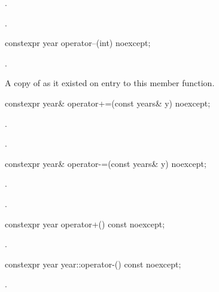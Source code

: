 \begin{itemdescr}
\pnum
\effects {}.

\pnum
\returns {}.
\end{itemdescr}

%
\begin{itemdecl}
constexpr year operator--(int) noexcept;
\end{itemdecl}

\begin{itemdescr}
\pnum
\effects {}.

\pnum
\returns A copy of  as it existed on entry to this member function.
\end{itemdescr}

%
\begin{itemdecl}
constexpr year& operator+=(const years& y) noexcept;
\end{itemdecl}

\begin{itemdescr}
\pnum
\effects {}.

\pnum
\returns {}.
\end{itemdescr}

%
\begin{itemdecl}
constexpr year& operator-=(const years& y) noexcept;
\end{itemdecl}

\begin{itemdescr}
\pnum
\effects {}.

\pnum
\returns {}.
\end{itemdescr}

%
\begin{itemdecl}
constexpr year operator+() const noexcept;
\end{itemdecl}

\begin{itemdescr}
\pnum
\returns {}.
\end{itemdescr}

%
\begin{itemdecl}
constexpr year year::operator-() const noexcept;
\end{itemdecl}

\begin{itemdescr}
\pnum
\returns {}.
\end{itemdescr}

